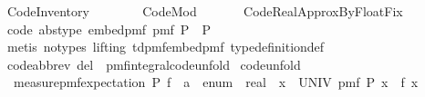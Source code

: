 %
\begin{isabellebody}%
%
%
\isadelimtheory
\isanewline
\isanewline
%
\endisadelimtheory
%
\isatagtheory
{}\isamarkupfalse%
\ Code{\isacharunderscore}{\kern0pt}Inventory\isanewline
\ \ \ \isanewline
\ \ \ \ Code{\isacharunderscore}{\kern0pt}Mod\isanewline
\ \ \isanewline
\ \ \ \ Code{\isacharunderscore}{\kern0pt}Real{\isacharunderscore}{\kern0pt}Approx{\isacharunderscore}{\kern0pt}By{\isacharunderscore}{\kern0pt}Float{\isacharunderscore}{\kern0pt}Fix\isanewline
{}%
\endisatagtheory
{\isafoldtheory}%
%
\isadelimtheory
%
\endisadelimtheory
%
\isadelimdocument
%
\endisadelimdocument
%
\isatagdocument
%
\isamarkuptrue%
%
\endisatagdocument
{\isafolddocument}%
%
\isadelimdocument
%
\endisadelimdocument
{}\isamarkupfalse%
\ {\isacharbrackleft}{\kern0pt}code\ abstype{\isacharbrackright}{\kern0pt}{\isacharcolon}{\kern0pt}\ {\isachardoublequoteopen}embed{\isacharunderscore}{\kern0pt}pmf\ {\isacharparenleft}{\kern0pt}pmf\ P{\isacharparenright}{\kern0pt}\ {\isacharequal}{\kern0pt}\ P{\isachardoublequoteclose}\isanewline
%
\isadelimproof
\ \ %
\endisadelimproof
%
\isatagproof
{}\isamarkupfalse%
\ {\isacharparenleft}{\kern0pt}metis\ {\isacharparenleft}{\kern0pt}no{\isacharunderscore}{\kern0pt}types{\isacharcomma}{\kern0pt}\ lifting{\isacharparenright}{\kern0pt}\ td{\isacharunderscore}{\kern0pt}pmf{\isacharunderscore}{\kern0pt}embed{\isacharunderscore}{\kern0pt}pmf\ type{\isacharunderscore}{\kern0pt}definition{\isacharunderscore}{\kern0pt}def{\isacharparenright}{\kern0pt}%
\endisatagproof
{\isafoldproof}%
%
\isadelimproof
\isanewline
%
\endisadelimproof
\isanewline
{}\isamarkupfalse%
\ {\isacharbrackleft}{\kern0pt}code{\isacharunderscore}{\kern0pt}abbrev\ del{\isacharbrackright}{\kern0pt}\ {\isacharequal}{\kern0pt}\ pmf{\isacharunderscore}{\kern0pt}integral{\isacharunderscore}{\kern0pt}code{\isacharunderscore}{\kern0pt}unfold\isanewline
\isanewline
{}\isamarkupfalse%
\ {\isacharbrackleft}{\kern0pt}code{\isacharunderscore}{\kern0pt}unfold{\isacharbrackright}{\kern0pt}{\isacharcolon}{\kern0pt}\ \isanewline
\ \ {\isachardoublequoteopen}measure{\isacharunderscore}{\kern0pt}pmf{\isachardot}{\kern0pt}expectation\ P\ {\isacharparenleft}{\kern0pt}f\ {\isacharcolon}{\kern0pt}{\isacharcolon}{\kern0pt}\ {\isacharprime}{\kern0pt}a\ {\isacharcolon}{\kern0pt}{\isacharcolon}{\kern0pt}\ enum\ {\isasymRightarrow}\ real{\isacharparenright}{\kern0pt}\ {\isacharequal}{\kern0pt}\ {\isacharparenleft}{\kern0pt}{\isasymSum}x\ {\isasymin}\ UNIV{\isachardot}{\kern0pt}\ pmf\ P\ x\ {\isacharasterisk}{\kern0pt}\ f\ x{\isacharparenright}{\kern0pt}{\isachardoublequoteclose}\isanewline

\end{isabellebody}
